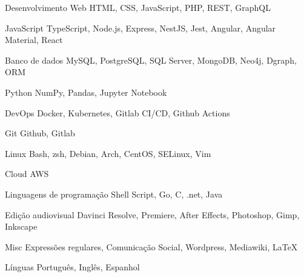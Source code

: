 

\begin{cvskills}

  \cvskill
    {Desenvolvimento Web} %
    {HTML, CSS, JavaScript, PHP, REST, GraphQL} %

  \cvskill
    {JavaScript} %
    {TypeScript, Node.js, Express, NestJS, Jest, Angular, Angular Material, React} %

  \cvskill
    {Banco de dados} %
    {MySQL, PostgreSQL, SQL Server, MongoDB, Neo4j, Dgraph, ORM} %

  \cvskill
    {Python} %
    {NumPy, Pandas, Jupyter Notebook} %

  \cvskill
    {DevOps} %
    {Docker, Kubernetes, Gitlab CI/CD, Github Actions} %

  \cvskill
    {Git} %
    {Github, Gitlab} %

  \cvskill
    {Linux} %
    {Bash, zsh, Debian, Arch, CentOS, SELinux, Vim} %

  \cvskill
    {Cloud} %
    {AWS} %

  \cvskill
    {Linguagens de programação} %
    {Shell Script, Go, C, .net, Java} %

  \cvskill
    {Edição audiovisual} %
    {Davinci Resolve, Premiere, After Effects, Photoshop, Gimp, Inkscape} %

  \cvskill
    {Misc} %
    {Expressões regulares, Comunicação Social, Wordpress, Mediawiki, \LaTeX} %

  \cvskill
    {Línguas} %
    {Português, Inglês, Espanhol} %

\end{cvskills}
